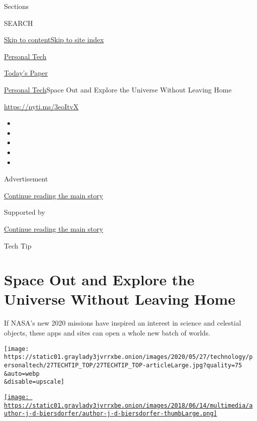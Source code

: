 Sections

SEARCH

\protect\hyperlink{site-content}{Skip to
content}\protect\hyperlink{site-index}{Skip to site index}

\href{https://www.nytimes3xbfgragh.onion/section/technology/personaltech}{Personal
Tech}

\href{https://myaccount.nytimes3xbfgragh.onion/auth/login?response_type=cookie\&client_id=vi}{}

\href{https://www.nytimes3xbfgragh.onion/section/todayspaper}{Today's
Paper}

\href{/section/technology/personaltech}{Personal Tech}\textbar{}Space
Out and Explore the Universe Without Leaving Home

\href{https://nyti.ms/3eoItvX}{https://nyti.ms/3eoItvX}

\begin{itemize}
\item
\item
\item
\item
\item
\end{itemize}

Advertisement

\protect\hyperlink{after-top}{Continue reading the main story}

Supported by

\protect\hyperlink{after-sponsor}{Continue reading the main story}

Tech Tip

\hypertarget{space-out-and-explore-the-universe-without-leaving-home}{%
\section{Space Out and Explore the Universe Without Leaving
Home}\label{space-out-and-explore-the-universe-without-leaving-home}}

If NASA's new 2020 missions have inspired an interest in science and
celestial objects, these apps and sites can open a whole new batch of
worlds.

\texttt{[image: https://static01.graylady3jvrrxbe.onion/images/2020/05/27/technology/personaltech/27TECHTIP\_TOP/27TECHTIP\_TOP-articleLarge.jpg?quality=75\\\&auto=webp\\\&disable=upscale]}

\href{https://www.nytimes3xbfgragh.onion/by/j-d-biersdorfer}{\texttt{[image: https://static01.graylady3jvrrxbe.onion/images/2018/06/14/multimedia/author-j-d-biersdorfer/author-j-d-biersdorfer-thumbLarge.png]}}

